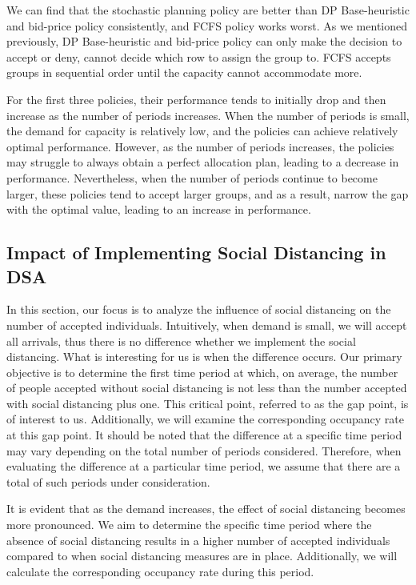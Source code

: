 We can find that the stochastic planning policy are better than DP Base-heuristic and bid-price policy consistently, and FCFS policy works worst. As we mentioned previously, DP Base-heuristic and bid-price policy can only make the decision to accept or deny, cannot decide which row to assign the group to. FCFS accepts groups in sequential order until the capacity cannot accommodate more.


For the first three policies, their performance tends to initially drop and then increase as the number of periods increases. When the number of periods is small, the demand for capacity is relatively low, and the policies can achieve relatively optimal performance. However, as the number of periods increases, the policies may struggle to always obtain a perfect allocation plan, leading to a decrease in performance. Nevertheless, when the number of periods continue to become larger, these policies tend to accept larger groups, and as a result, narrow the gap with the optimal value, leading to an increase in performance.


\subsection{Impact of Implementing Social Distancing in DSA}
In this section, our focus is to analyze the influence of social distancing on the number of accepted individuals. Intuitively, when demand is small, we will accept all arrivals, thus there is no difference whether we implement the social distancing. What is interesting for us is when the difference occurs. Our primary objective is to determine the first time period at which, on average, the number of people accepted without social distancing is not less than the number accepted with social distancing plus one. This critical point, referred to as the gap point, is of interest to us. Additionally, we will examine the corresponding occupancy rate at this gap point. It should be noted that the difference at a specific time period may vary depending on the total number of periods considered. Therefore, when evaluating the difference at a particular time period, we assume that there are a total of such periods under consideration.


It is evident that as the demand increases, the effect of social distancing becomes more pronounced. We aim to determine the specific time period where the absence of social distancing results in a higher number of accepted individuals compared to when social distancing measures are in place. Additionally, we will calculate the corresponding occupancy rate during this period.

